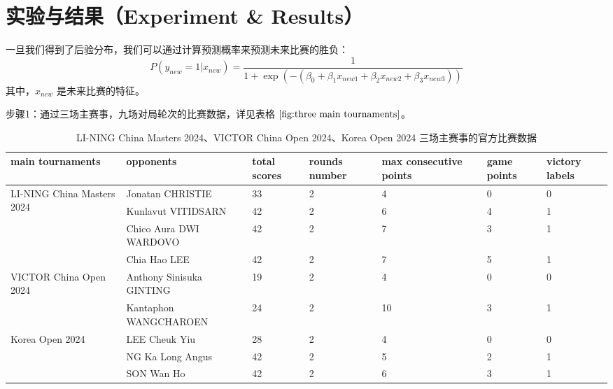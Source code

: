 \documentclass[12pt]{article}
\begin{document}
\section{实验与结果（Experiment \& Results）}
一旦我们得到了后验分布，我们可以通过计算预测概率来预测未来比赛的胜负：
\begin{equation}
    P(y_{new}=1|x_{new})=\frac{1}{1+\exp(-(\beta_0+\beta_1x_{new1}+\beta_2x_{new2}+\beta_3x_{new3}))}
\end{equation}
其中，$x_{new}$ 是未来比赛的特征。

步骤1：通过三场主赛事，九场对局轮次的比赛数据，详见表格 $\ref{fig:three main tournaments}$。

\renewcommand{\arraystretch}{1.2} %
\begin{table}[h!]
\centering
\scriptsize %
\setlength{\tabcolsep}{3pt} %
\begin{tabular}{|p{3.5cm}|p{3.8cm}|p{1.2cm}|p{1.2cm}|p{1.8cm}|p{1.2cm}|p{1.2cm}|}
\hline
\textbf{main tournaments} & \textbf{opponents} & \textbf{total scores} & \textbf{rounds number} & \textbf{max consecutive points} & \textbf{game points} & \textbf{victory labels} \\ \hline

\multirow{4}{3.5cm}{LI-NING China Masters 2024} 
& Jonatan CHRISTIE          & 33 & 2 & 4  & 0 & 0 \\ \cline{2-7}
& Kunlavut VITIDSARN        & 42 & 2 & 6  & 4 & 1 \\ \cline{2-7}
& Chico Aura DWI WARDOVO    & 42 & 2 & 7  & 3 & 1 \\ \cline{2-7}
& Chia Hao LEE              & 42 & 2 & 7  & 5 & 1 \\ \hline

\multirow{2}{3.5cm}{VICTOR China Open 2024} 
& Anthony Sinisuka GINTING  & 19 & 2 & 4  & 0 & 0 \\ \cline{2-7}
& Kantaphon WANGCHAROEN     & 24 & 2 & 10 & 3 & 1 \\ \hline

\multirow{3}{3.5cm}{Korea Open 2024} 
& LEE Cheuk Yiu             & 28 & 2 & 4  & 0 & 0 \\ \cline{2-7}
& NG Ka Long Angus          & 42 & 2 & 5  & 2 & 1 \\ \cline{2-7}
& SON Wan Ho                & 42 & 2 & 6  & 3 & 1 \\ \hline

\end{tabular}
\caption{LI-NING China Masters 2024、VICTOR China Open 2024、Korea Open 2024 三场主赛事的官方比赛数据}
\label{fig:three main tournaments}
\end{table}
\end{document}
